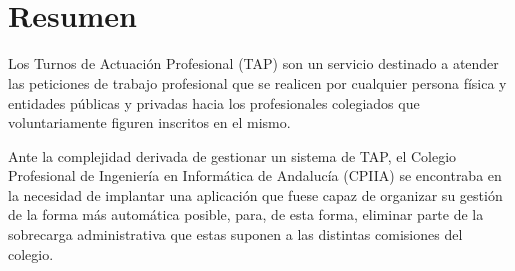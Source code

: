 




\newpage~\thispagestyle{empty}

\newpage~\thispagestyle{plain}
\section*{Resumen}

Los Turnos de Actuación Profesional (TAP) son un servicio destinado a atender las peticiones de trabajo profesional que se realicen por cualquier persona física y entidades públicas y privadas hacia los profesionales colegiados que voluntariamente figuren inscritos en el mismo. \par \vspace{\baselineskip}

Ante la complejidad derivada de gestionar un sistema de TAP, el Colegio Profesional de Ingeniería en Informática de Andalucía (CPIIA) se encontraba en la necesidad de implantar una aplicación que fuese capaz de organizar su gestión de la forma más automática posible, para, de esta forma, eliminar parte de la sobrecarga administrativa que estas suponen a las distintas comisiones del colegio. \par \vspace{\baselineskip}

